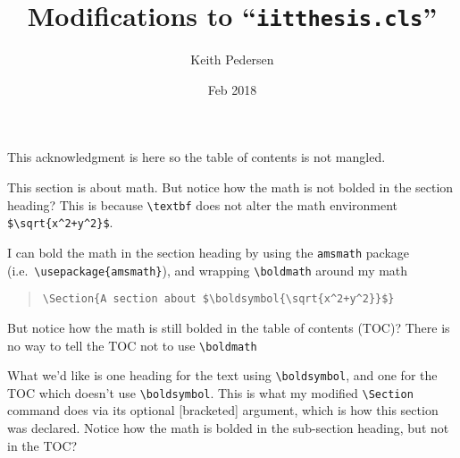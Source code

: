 \documentclass{iitthesis}
\begin{document}
\title{Modifications to ``{\tt iitthesis.cls}''}


\author{Keith Pedersen}
\degree{}
\dept{}
\date{Feb 2018}

\maketitle

\prelimpages

\begin{acknowledgement}     %
\par 
This acknowledgment is here so the table of contents is not mangled.
\end{acknowledgement}
\tableofcontents
\clearpage

\textpages


\label{sec:no-bold-in-text}

This section is about math. 
But notice how the math is not bolded in the section heading?
This is because \verb|\textbf| does not alter the math environment \verb|$\sqrt{x^2+y^2}$|.

\label{sec:bold-in-TOC}

I can bold the math in the section heading by using the {\tt amsmath} package 
(i.e.\ \verb|\usepackage{amsmath}|), and wrapping {\tt \verb|\boldmath|} around my math
\begin{quotation}
	\verb|\Section{A section about $\boldsymbol{\sqrt{x^2+y^2}}$}|
\end{quotation}
But notice how the math is still bolded in the table of contents (TOC)?
There is no way to tell the TOC not to use \verb|\boldmath|


What we'd like is one heading for the text using \verb|\boldsymbol|, 
and one for the TOC which doesn't use \verb|\boldsymbol|.
This is what my modified \verb|\Section| command does
via its optional [bracketed] argument, 
which is how this section was declared.
Notice how the math is bolded in the sub-section heading, 
but not in the TOC? 
\end{document}
